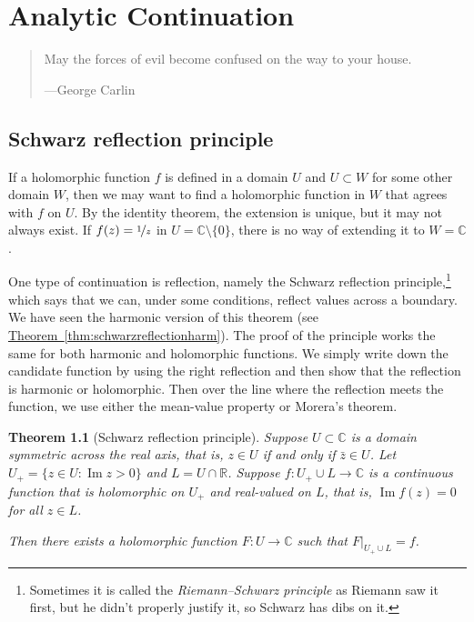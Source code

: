 \documentclass[12pt,openany]{book}
\renewcommand{\Im}{\operatorname{Im}}
\newcommand{\C}{{\mathbb{C}}}
\newcommand{\R}{{\mathbb{R}}}
\newcommand{\myindex}[1]{#1\index{#1}}
\theoremstyle{plain}
\newtheorem{thm}{Theorem}[section]
\theoremstyle{remark}
\theoremstyle{definition}
\newenvironment{myepigraph}{%
    \begin{quote}%
    \begingroup\itshape
}{%
    \endgroup%
    \end{quote}
}
\theoremstyle{exercise}
\theoremstyle{example}
\newcommand{\thmref}[1]{\hyperref[#1]{Theorem~\ref*{#1}}}
\begin{document}

\chapter{Analytic Continuation} \label{ch:analcont}

\begin{myepigraph}
May the forces of evil become confused on the way to your house.

---George Carlin
\end{myepigraph}


\section{Schwarz reflection principle}

If a holomorphic function $f$ is defined in a
domain $U$ and $U \subset W$ for some other domain $W$,
then we may want to find a holomorphic function in $W$ that agrees with
$f$ on $U$.  By the identity theorem, the extension is unique, but it may not
always exist.  If $f(z) =
\nicefrac{1}{z}$ in $U = \C \setminus \{ 0 \}$, there is no way
of extending it to $W = \C$.

One type of continuation is reflection, namely the Schwarz reflection
principle,\footnote{Sometimes it is called the
\emph{\myindex{Riemann--Schwarz principle}} as Riemann saw it first, but he 
didn't properly justify it, so Schwarz has dibs on it.}
which 
says that we can, under some conditions, reflect values across a boundary.
We have seen the harmonic version
of this theorem (see \thmref{thm:schwarzreflectionharm}).
The proof of the principle works the same for both
harmonic and holomorphic functions.
We simply write down the candidate function by using
the right reflection and then show that the reflection is harmonic or
holomorphic.  Then over the line where the reflection meets the function,
we use either the
mean-value property or Morera's theorem.

\begin{thm}[Schwarz reflection principle]
\label{thm:schwarzreflectionholo}
Suppose $U \subset \C$ is a domain symmetric across the real axis, that is,
$z \in U$ if and only if $\bar{z} \in U$.
Let $U_+ = \{ z \in U : \Im z > 0 \}$ and $L = U \cap \R$.
Suppose $f \colon U_+ \cup L \to \C$ is a continuous function that is
holomorphic on $U_+$ and real-valued on $L$, that is,
$\Im f(z) = 0$ for all $z \in L$.

Then there exists a holomorphic function $F \colon U \to \C$ such that
$F|_{U_+ \cup L} = f$.
\end{thm}
\end{document}
